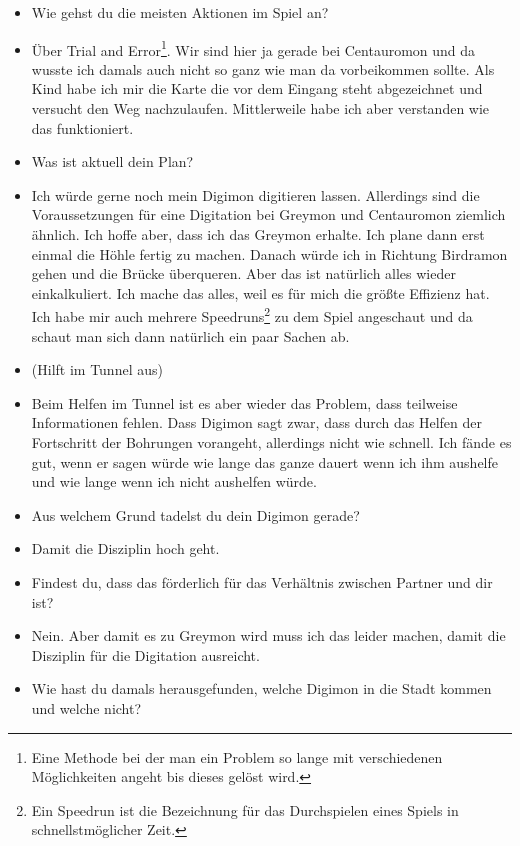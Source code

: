 {\begin{itemize}[]
    \item {} Wie gehst du die meisten Aktionen im Spiel an?
    \item {} Über Trial and Error\footnote{Eine Methode bei der man ein Problem so lange mit verschiedenen Möglichkeiten angeht bis dieses gelöst wird.}. Wir sind hier ja gerade bei Centauromon und da wusste ich damals auch nicht so ganz wie man da vorbeikommen sollte. Als Kind habe ich mir die Karte die vor dem Eingang steht abgezeichnet und versucht den Weg nachzulaufen. Mittlerweile habe ich aber verstanden wie das funktioniert.
    \item {} Was ist aktuell dein Plan?
    \item {} Ich würde gerne noch mein Digimon digitieren lassen. Allerdings sind die Voraussetzungen für eine Digitation bei Greymon und Centauromon ziemlich ähnlich. Ich hoffe aber, dass ich das Greymon erhalte. Ich plane dann erst einmal die Höhle fertig zu machen. Danach würde ich in Richtung Birdramon gehen und die Brücke überqueren. Aber das ist natürlich alles wieder einkalkuliert. Ich mache das alles, weil es für mich die größte Effizienz hat. Ich habe mir auch mehrere Speedruns\footnote{Ein Speedrun ist die Bezeichnung für das Durchspielen eines Spiels in schnellstmöglicher Zeit.} zu dem Spiel angeschaut und da schaut man sich dann natürlich ein paar Sachen ab.
    \item {} (Hilft im Tunnel aus)
    \item {} Beim Helfen im Tunnel ist es aber wieder das Problem, dass teilweise Informationen fehlen. Dass Digimon sagt zwar, dass durch das Helfen der Fortschritt der Bohrungen vorangeht, allerdings nicht wie schnell. Ich fände es gut, wenn er sagen würde wie lange das ganze dauert wenn ich ihm aushelfe und wie lange wenn ich nicht aushelfen würde. 
    \item {} Aus welchem Grund tadelst du dein Digimon gerade?
    \item {} Damit die Disziplin hoch geht.
    \item {} Findest du, dass das förderlich für das Verhältnis zwischen Partner und dir ist?
    \item {} Nein. Aber damit es zu Greymon wird muss ich das leider machen, damit die Disziplin für die Digitation ausreicht. 
    \item {} Wie hast du damals herausgefunden, welche Digimon in die Stadt kommen und welche nicht?

\end{itemize}}
